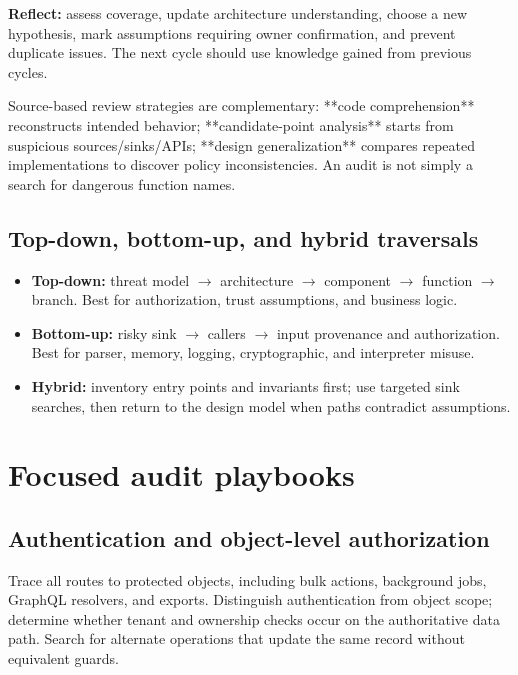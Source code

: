 \documentclass[
  letterpaper,
]{article}
\providecommand{\tightlist}{%
  \setlength{\itemsep}{0pt}\setlength{\parskip}{0pt}}
\begin{document}
\textbf{Reflect:} assess coverage, update architecture understanding,
choose a new hypothesis, mark assumptions requiring owner confirmation,
and prevent duplicate issues. The next cycle should use knowledge gained
from previous cycles.

\begin{sourceconcept}
Source-based review strategies are complementary: **code comprehension** reconstructs intended behavior; **candidate-point analysis** starts from suspicious sources/sinks/APIs; **design generalization** compares repeated implementations to discover policy inconsistencies. An audit is not simply a search for dangerous function names.
\end{sourceconcept}

\subsection{Top-down, bottom-up, and hybrid
traversals}\label{top-down-bottom-up-and-hybrid-traversals}

\begin{itemize}
\tightlist
\item
  \textbf{Top-down:} threat model \(\to\) architecture \(\to\) component
  \(\to\) function \(\to\) branch. Best for authorization, trust
  assumptions, and business logic.
\item
  \textbf{Bottom-up:} risky sink \(\to\) callers \(\to\) input
  provenance and authorization. Best for parser, memory, logging,
  cryptographic, and interpreter misuse.
\item
  \textbf{Hybrid:} inventory entry points and invariants first; use
  targeted sink searches, then return to the design model when paths
  contradict assumptions.
\end{itemize}

\section{Focused audit playbooks}\label{focused-audit-playbooks}

\subsection{Authentication and object-level
authorization}\label{authentication-and-object-level-authorization}

Trace all routes to protected objects, including bulk actions,
background jobs, GraphQL resolvers, and exports. Distinguish
authentication from object scope; determine whether tenant and ownership
checks occur on the authoritative data path. Search for alternate
operations that update the same record without equivalent guards.
\end{document}
